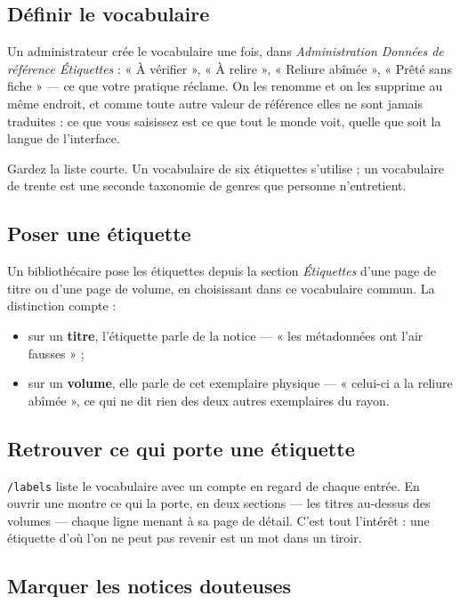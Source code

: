 \subsection*{Définir le vocabulaire}

Un administrateur crée le vocabulaire une fois, dans
\emph{Administration \textrightarrow{} Données de référence
\textrightarrow{} Étiquettes} : « À vérifier », « À relire », « Reliure
abîmée », « Prêté sans fiche » --- ce que votre pratique réclame. On les
renomme et on les supprime au même endroit, et comme toute autre valeur
de référence elles ne sont jamais traduites : ce que vous saisissez est
ce que tout le monde voit, quelle que soit la langue de l'interface.

Gardez la liste courte. Un vocabulaire de six étiquettes s'utilise ;
un vocabulaire de trente est une seconde taxonomie de genres que
personne n'entretient.

\subsection*{Poser une étiquette}

Un bibliothécaire pose les étiquettes depuis la section
\emph{Étiquettes} d'une page de titre ou d'une page de volume, en
choisissant dans ce vocabulaire commun. La distinction compte :

\begin{itemize}
  \item sur un \textbf{titre}, l'étiquette parle de la notice --- « les
        métadonnées ont l'air fausses » ;
  \item sur un \textbf{volume}, elle parle de cet exemplaire physique
        --- « celui-ci a la reliure abîmée », ce qui ne dit rien des
        deux autres exemplaires du rayon.
\end{itemize}

\subsection*{Retrouver ce qui porte une étiquette}

\texttt{/labels} liste le vocabulaire avec un compte en regard de chaque
entrée. En ouvrir une montre ce qui la porte, en deux sections --- les
titres au-dessus des volumes --- chaque ligne menant à sa page de
détail. C'est tout l'intérêt : une étiquette d'où l'on ne peut pas
revenir est un mot dans un tiroir.

\subsection*{Marquer les notices douteuses}

